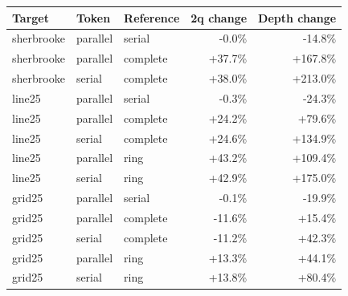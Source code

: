 \begin{tabular}{lllrr}
\toprule
Target & Token & Reference & 2q change & Depth change\\
\midrule
sherbrooke & parallel & serial & -0.0\% & -14.8\%\\
sherbrooke & parallel & complete & +37.7\% & +167.8\%\\
sherbrooke & serial & complete & +38.0\% & +213.0\%\\
line25 & parallel & serial & -0.3\% & -24.3\%\\
line25 & parallel & complete & +24.2\% & +79.6\%\\
line25 & serial & complete & +24.6\% & +134.9\%\\
line25 & parallel & ring & +43.2\% & +109.4\%\\
line25 & serial & ring & +42.9\% & +175.0\%\\
grid25 & parallel & serial & -0.1\% & -19.9\%\\
grid25 & parallel & complete & -11.6\% & +15.4\%\\
grid25 & serial & complete & -11.2\% & +42.3\%\\
grid25 & parallel & ring & +13.3\% & +44.1\%\\
grid25 & serial & ring & +13.8\% & +80.4\%\\
\bottomrule
\end{tabular}
